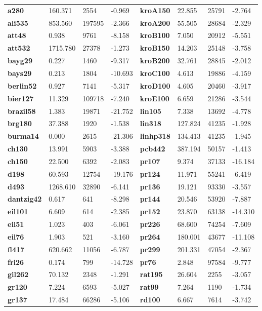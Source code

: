 \documentclass{article}
\begin{document}
\begin{table}[H]
\begin{tabular}{>{\bfseries}llll>{\bfseries}llll}
\midrule
a280 & 160.371 & 2554 & -0.969 & kroA150 & 22.855 & 25791 & -2.764 \\
ali535 & 853.560 & 197595 & -2.366 & kroA200 & 55.505 & 28684 & -2.329 \\
att48 & 0.938 & 9761 & -8.158 & kroB100 & 7.050 & 20912 & -5.551 \\
att532 & 1715.780 & 27378 & -1.273 & kroB150 & 14.203 & 25148 & -3.758 \\
bayg29 & 0.227 & 1460 & -9.317 & kroB200 & 32.761 & 28845 & -2.012 \\
bays29 & 0.213 & 1804 & -10.693 & kroC100 & 4.613 & 19886 & -4.159 \\
berlin52 & 0.927 & 7141 & -5.317 & kroD100 & 4.605 & 20460 & -3.917 \\
bier127 & 11.329 & 109718 & -7.240 & kroE100 & 6.659 & 21286 & -3.544 \\
brazil58 & 1.383 & 19871 & -21.752 & lin105 & 7.338 & 13692 & -4.778 \\
brg180 & 37.388 & 1920 & -1.538 & lin318 & 127.824 & 41235 & -1.928 \\
burma14 & 0.000 & 2615 & -21.306 & linhp318 & 134.413 & 41235 & -1.945 \\
ch130 & 13.991 & 5903 & -3.388 & pcb442 & 387.194 & 50157 & -1.413 \\
ch150 & 22.500 & 6392 & -2.083 & pr107 & 9.374 & 37133 & -16.184 \\
d198 & 60.593 & 12754 & -19.176 & pr124 & 11.971 & 55241 & -6.419 \\
d493 & 1268.610 & 32890 & -6.141 & pr136 & 19.121 & 93330 & -3.557 \\
dantzig42 & 0.617 & 641 & -8.298 & pr144 & 20.546 & 53920 & -7.887 \\
eil101 & 6.609 & 614 & -2.385 & pr152 & 23.870 & 63138 & -14.310 \\
eil51 & 1.023 & 403 & -6.061 & pr226 & 68.600 & 74254 & -7.609 \\
eil76 & 1.903 & 521 & -3.160 & pr264 & 180.001 & 43677 & -11.108 \\
fl417 & 620.662 & 11056 & -6.787 & pr299 & 201.331 & 47054 & -2.367 \\
fri26 & 0.174 & 799 & -14.728 & pr76 & 2.848 & 97584 & -9.777 \\
gil262 & 70.132 & 2348 & -1.291 & rat195 & 26.604 & 2255 & -3.057 \\
gr120 & 7.224 & 6593 & -5.027 & rat99 & 7.264 & 1190 & -1.734 \\
gr137 & 17.484 & 66286 & -5.106 & rd100 & 6.667 & 7614 & -3.742 \\

\end{tabular}
\end{table}
\end{document}
